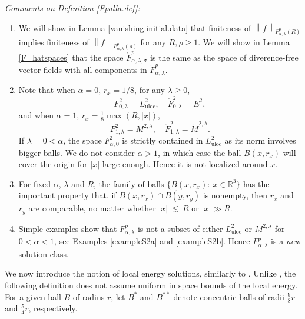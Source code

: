 \documentclass[11pt]{article}
\numberwithin{equation}{section}
\theoremstyle{remark}
\theoremstyle{definition}
\newcommand{\norm}[1]{\left \| #1 \right \|}
\newcommand{\R}{\mathbb{R}}
\newcommand{\si}{\sigma}
\newcommand{\lec}{{\ \lesssim \ }}
\newcommand\al{\alpha}
\newcommand\la{\lambda}
\newcommand{\EN}[1]{\begin{enumerate} #1 \end{enumerate}}
\newcommand{\uloc}{{\mathrm{uloc}}}
\begin{document}
\emph{Comments on Definition \ref{Fpalla.def}:}
\EN{
\item We will show in Lemma \ref{vanishing.initial.data} that finiteness of $\norm{f}_{F^p_{\al,\la}(R)}$ implies finiteness of $\norm{f}_{F^p_{\al,\la}(\rho)}$ for any $R,\rho\ge1$. We will show in Lemma \ref{F_hatspaces} that the space
$\mathring F^p_{\al,\la,\si}$ is the same as the space of diverence-free vector fields with all components in $\mathring F^p_{\al,\la}$.

\item Note that when $\al=0$, $r_x=1/8$, for any $\la\ge0$,
\[
F_{0,\la}^2  = L^2_\uloc, \quad \mathring F_{0,\la}^2  =E^2,
\]
and when $\al=1$, $r_x=\frac 1 8\max(R,|x|)$,
\[
F_{1,\la}^2  = M^{2,\la}, \quad \mathring F_{1,\la}^2  = \mathring M^{2,\la}.
\]
If $\la=0<\al$, the space $F_{\al,0}^2$ is strictly contained in $L^2_\uloc$ as its norm involves bigger balls.
%
We do not consider $\al>1$, in which case the ball $B(x,r_x)$ will cover the origin for $|x|$ large enough. Hence it is not localized around $x$.

\item For fixed $\al$, $\la$ and $R$, the family of balls $\{B(x, r_x): \ x \in \R^3\}$ has the important property that, if $B(x, r_x) \cap B(y, r_y)$ is nonempty, then $r_x$ and $r_y$ are comparable, no matter whether $|x| \lec R$ or $|x| \gg R$.

\item Simple examples show that $F_{\al,\la}^p$ is not a subset of either $L^2_\uloc$ or $M^{2,\lambda}$ for $0<\al<1$,
see Examples \ref{exampleS2a} and \ref{exampleS2b}. Hence $F_{\al,\la}^p$ is
a \emph{new} solution class. %
}

%


We now introduce the notion of local energy solutions, similarly to \cite{BK,BKT}.
Unlike \cite{LR,KiSe,KwTs}, the following definition does not assume uniform in space bounds of the local energy.
For a given ball $B$ of radius $r$, let $B^*$ and $B^{**}$ denote concentric balls of radii $\frac 98r$ and $\frac 54r$, respectively.
\end{document}
